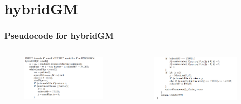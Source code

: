 \documentclass[aspectratio=169%
,serif,mathserif]{beamer}
\begin{document}
\section{hybridGM}
\begin{frame}
	\frametitle{Pseudocode for hybridGM}
	\begin{columns}
		\begin{column}{.5\textwidth}
			\begin{figure}[htbp]
				\includegraphics[width=1\linewidth]{7.png}
			\end{figure}
		\end{column}

		\begin{column}{.5\textwidth}
			\begin{figure}[htbp]
				\includegraphics[width=1\linewidth]{8.png}
			\end{figure}
		\end{column}
	\end{columns}


\end{frame}

\end{document}
